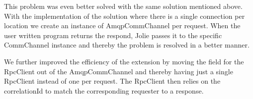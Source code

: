 This problem was even better solved with the same solution mentioned above. With the implementation of the solution where there is a single connection per location we create an instance of AmqpCommChannel per request. When the user written program returns the respond, Jolie passes it to the specific CommChannel instance and thereby the problem is resolved in a better manner.

We further improved the efficiency of the extension by moving the field for the RpcClient out of the AmqpCommChannel and thereby having just a single RpcClient instead of one per request. The RpcClient then relies on the correlationId to match the corresponding requester to a response.
\newpage
